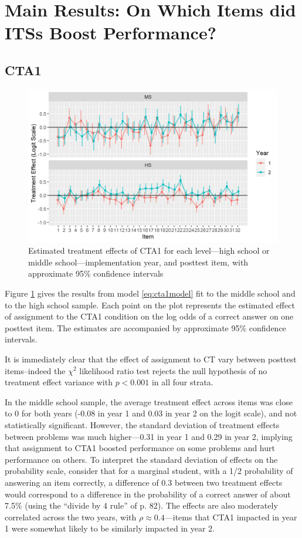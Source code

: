\documentclass{edm_article}
\begin{document}
\section{Main Results: On Which Items did ITSs Boost Performance?}\label{sec:results}
\subsection{CTA1}
\begin{figure}
  \centering
  \includegraphics{../ctEffects.jpg}
  \caption{Estimated treatment effects of CTA1 for each level---high school
    or middle school---implementation year, and posttest item, with
    approximate 95\% confidence intervals}
  \label{fig:cta1Results1}
\end{figure}


Figure \ref{fig:cta1Results1} gives the results from model
\eqref{eq:cta1model} fit to the middle school and to the high school
sample.
Each point on the plot represents the estimated effect of assignment
to the CTA1 condition on the log odds of a correct answer on one
posttest item.
The estimates are accompanied by approximate 95\% confidence
intervals.

It is immediately clear that the effect of assignment to CT vary
between posttest items--indeed the $\chi^2$ likelihood ratio test
rejects the null hypothesis of no treatment effect variance with
$p<0.001$ in all four strata.

In the middle school sample, the average treatment effect across items
was close to 0 for both years (-0.08 in year 1 and 0.03 in year 2 on
the logit scale), and not statistically significant.
However, the standard deviation of treatment effects between problems
was much higher---0.31 in year 1 and 0.29 in year 2, implying that
assignment to CTA1 boosted performance on some problems and hurt
performance on others.
To interpret the standard deviation of effects on the probability
scale, consider that for a marginal student, with a 1/2 probability of
answering an item correctly, a difference of 0.3 between two treatment
effects would correspond to a difference in the probability of a
correct answer of about 7.5\% (using the ``divide by 4 rule'' of
\cite{gelmanHill} p. 82).
The effects are also moderately correlated across the two years, with
$\rho\approx 0.4$---items that CTA1 impacted in year 1 were somewhat
likely to be similarly impacted in year 2.
\end{document}
